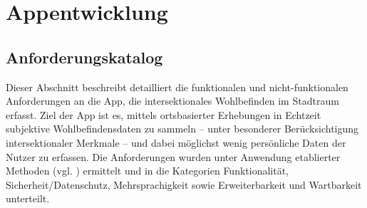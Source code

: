 \section{Appentwicklung}
\subsection{Anforderungskatalog}

Dieser Abschnitt beschreibt detailliert die funktionalen und nicht-funktionalen Anforderungen an die App, die intersektionales Wohlbefinden im Stadtraum erfasst. Ziel der App ist es, mittels ortsbasierter Erhebungen in Echtzeit subjektive Wohlbefindensdaten zu sammeln – unter besonderer Berücksichtigung intersektionaler Merkmale – und dabei möglichst wenig persönliche Daten der Nutzer zu erfassen. Die Anforderungen wurden unter Anwendung etablierter Methoden (vgl. \cite{cleggCaseMethodFastTrack1994}) ermittelt und in die Kategorien Funktionalität, Sicherheit/Datenschutz, Mehrsprachigkeit sowie Erweiterbarkeit und Wartbarkeit unterteilt.

